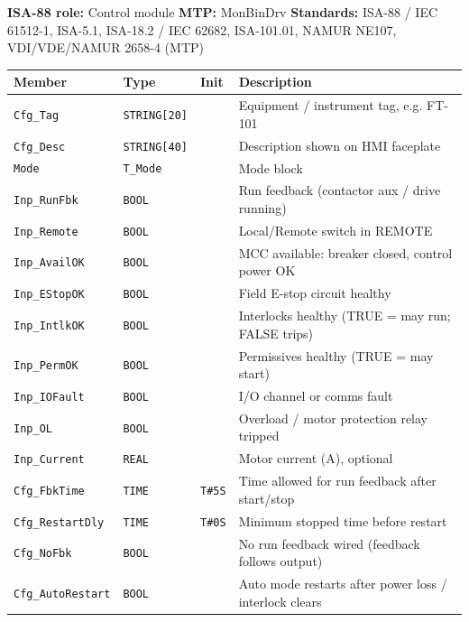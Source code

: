 {\small\textbf{ISA-88 role:} Control module \quad \textbf{MTP:} MonBinDrv \quad \textbf{Standards:} ISA-88 /\allowbreak{} IEC 61512-1, ISA-5.1, ISA-18.2 /\allowbreak{} IEC 62682, ISA-101.01, NAMUR NE107, VDI/\allowbreak{}VDE/\allowbreak{}NAMUR 2658-4 (MTP)}
{\footnotesize
\begin{longtable}{@{}>{\raggedright\arraybackslash}p{3.4cm}>{\raggedright\arraybackslash}p{3.3cm}>{\raggedright\arraybackslash}p{1.3cm}>{\raggedright\arraybackslash}p{6.4cm}@{}}
\toprule
\rowcolor{tblhead}\textbf{Member} & \textbf{Type} & \textbf{Init} & \textbf{Description} \\
\midrule
\endhead
\texttt{Cfg\_Tag} & \texttt{STRING[20]} &  & Equipment /\allowbreak{} instrument tag, e.g. FT-101 \\
\texttt{Cfg\_Desc} & \texttt{STRING[40]} &  & Description shown on HMI faceplate \\
\texttt{Mode} & \texttt{T\_Mode} &  & Mode block \\
\texttt{Inp\_RunFbk} & \texttt{BOOL} &  & Run feedback (contactor aux /\allowbreak{} drive running) \\
\texttt{Inp\_Remote} & \texttt{BOOL} &  & Local/\allowbreak{}Remote switch in REMOTE \\
\texttt{Inp\_AvailOK} & \texttt{BOOL} &  & MCC available: breaker closed, control power OK \\
\texttt{Inp\_EStopOK} & \texttt{BOOL} &  & Field E-stop circuit healthy \\
\texttt{Inp\_IntlkOK} & \texttt{BOOL} &  & Interlocks healthy (TRUE = may run; FALSE trips) \\
\texttt{Inp\_PermOK} & \texttt{BOOL} &  & Permissives healthy (TRUE = may start) \\
\texttt{Inp\_IOFault} & \texttt{BOOL} &  & I/\allowbreak{}O channel or comms fault \\
\texttt{Inp\_OL} & \texttt{BOOL} &  & Overload /\allowbreak{} motor protection relay tripped \\
\texttt{Inp\_Current} & \texttt{REAL} &  & Motor current (A), optional \\
\texttt{Cfg\_FbkTime} & \texttt{TIME} & \texttt{T\#5S} & Time allowed for run feedback after start/\allowbreak{}stop \\
\texttt{Cfg\_RestartDly} & \texttt{TIME} & \texttt{T\#0S} & Minimum stopped time before restart \\
\texttt{Cfg\_NoFbk} & \texttt{BOOL} &  & No run feedback wired (feedback follows output) \\
\texttt{Cfg\_AutoRestart} & \texttt{BOOL} &  & Auto mode restarts after power loss /\allowbreak{} interlock clears \\

\end{longtable}}
